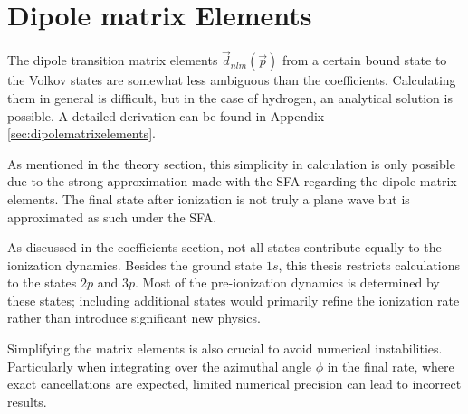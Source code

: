 





\section{Dipole matrix Elements}
The dipole transition matrix elements $\vec{d}_{nlm}(\vec{p})$ from a certain bound state to the Volkov states are somewhat less ambiguous than the coefficients. 
Calculating them in general is difficult, but in the case of hydrogen, an analytical solution is possible. A detailed derivation can be found in Appendix \ref{sec:dipolematrixelements}.

As mentioned in the theory section, this simplicity in calculation is only possible due to the strong approximation made with the SFA regarding the dipole matrix elements. 
The final state after ionization is not truly a plane wave but is approximated as such under the SFA.

As discussed in the coefficients section, not all states contribute equally to the ionization dynamics. 
Besides the ground state $1s$, this thesis restricts calculations to the states $2p$ and $3p$. Most of the pre-ionization dynamics is determined by these states; including additional states would primarily refine the ionization rate rather than introduce significant new physics.

Simplifying the matrix elements is also crucial to avoid numerical instabilities. 
Particularly when integrating over the azimuthal angle $\phi$ in the final rate, where exact cancellations are expected, limited numerical precision can lead to incorrect results.

